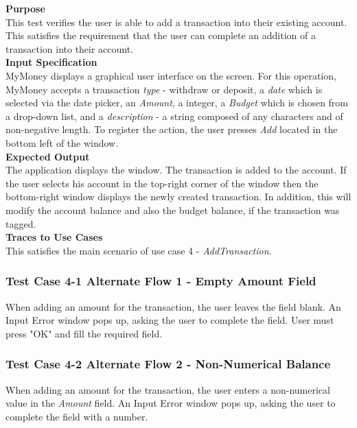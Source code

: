 \documentclass[12pt]{article}
\begin{document}
\noindent
{\bf Purpose}\\
This test verifies the user is able to add a transaction into their existing account.
This satisfies the requirement that the user can complete an addition of a transaction into their account.\\
                                        
\noindent
{\bf Input Specification}\\
MyMoney displays a graphical user interface on the screen.
For this operation, MyMoney accepts a transaction \textit{type} - withdraw or deposit, a \textit{date}
which is selected via the date picker, an \textit{Amount}, a integer, a \textit{Budget} which is chosen
from a drop-down list, and a \textit{description} - a string composed of any characters and
of non-negative length. To register the action, the user presses \textit{Add} located in the bottom left
of the window. \\

\noindent
{\bf Expected Output}\\
The application displays the window.    
The transaction is added to the account.
If the user selects his account in the top-right corner of the window then
the bottom-right window displays the newly created transaction. In addition, this will modify the account balance and also the budget balance, if the transaction was tagged. \\
                                                
\noindent
{\bf Traces to Use Cases}\\
This satisfies the main scenario of use case 4 - \textit{AddTransaction}.\\

\subsubsection
{Test Case 4-1 Alternate Flow 1 - Empty Amount Field}
When adding an amount for the transaction, the user leaves the field blank.
An Input Error window pops up, asking the user to complete the field. User must press "OK" and fill the required field.\\

\subsubsection
{Test Case 4-2 Alternate Flow 2 - Non-Numerical Balance}
When adding an amount for the transaction, the user enters a non-numerical value in the \textit{Amount} field. 
An Input Error window pops up, asking the user to complete the field with a number. 
\end{document}
